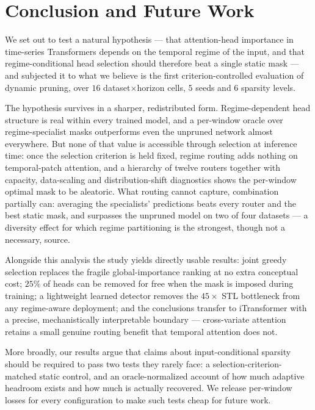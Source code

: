 
\section{Conclusion and Future Work}
\label{sec:conclusion}

We set out to test a natural hypothesis --- that attention-head
importance in time-series Transformers depends on the temporal regime of
the input, and that regime-conditional head selection should therefore
beat a single static mask --- and subjected it to what we believe is the
first criterion-controlled evaluation of dynamic pruning, over
$16$ dataset$\times$horizon cells, $5$ seeds and $6$ sparsity levels.

The hypothesis survives in a sharper, redistributed form. Regime-dependent
head structure is real within every trained model, and a per-window
oracle over regime-specialist masks outperforms even the unpruned
network almost everywhere. But none of that value is accessible through
selection at inference time: once the selection criterion is held fixed,
regime routing adds nothing on temporal-patch attention, and a hierarchy
of twelve routers together with capacity, data-scaling and
distribution-shift diagnostics shows the per-window optimal mask to be
aleatoric. What routing cannot capture, combination partially can:
averaging the specialists' predictions beats every router and the best
static mask, and surpasses the unpruned model on two of four datasets ---
a diversity effect for which regime partitioning is the strongest, though
not a necessary, source.

Alongside this analysis the study yields directly usable results: joint
greedy selection replaces the fragile global-importance ranking at no
extra conceptual cost; $25\%$ of heads can be removed for free when the
mask is imposed during training; a lightweight learned detector removes
the $45\times$ STL bottleneck from any regime-aware deployment; and the
conclusions transfer to iTransformer with a precise, mechanistically
interpretable boundary --- cross-variate attention retains a small
genuine routing benefit that temporal attention does not.

More broadly, our results argue that claims about input-conditional
sparsity should be required to pass two tests they rarely face: a
selection-criterion-matched static control, and an oracle-normalized
account of how much adaptive headroom exists and how much is actually
recovered. We release per-window losses for every configuration to make
such tests cheap for future work.

